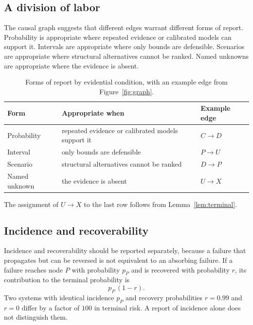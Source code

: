\documentclass[11pt]{article}
\theoremstyle{remark}
\begin{document}
\subsection{A division of labor}

The causal graph suggests that different edges warrant different forms of report. Probability is appropriate where repeated evidence or calibrated models can support it. Intervals are appropriate where only bounds are defensible. Scenarios are appropriate where structural alternatives cannot be ranked. Named unknowns are appropriate where the evidence is absent.

\begin{table}[h]
\centering
\caption{Forms of report by evidential condition, with an example edge from Figure~\ref{fig:graph}.}\label{tab:division}
\begin{tabular}{@{}p{2.4cm}p{6.2cm}p{2.4cm}@{}}
\toprule
Form & Appropriate when & Example edge \\
\midrule
Probability & repeated evidence or calibrated models support it & $C\to D$ \\
Interval & only bounds are defensible & $P\to U$ \\
Scenario & structural alternatives cannot be ranked & $D\to P$ \\
Named unknown & the evidence is absent & $U\to X$ \\
\bottomrule
\end{tabular}
\end{table}

The assignment of $U\to X$ to the last row follows from Lemma~\ref{lem:terminal}.

\subsection{Incidence and recoverability}

Incidence and recoverability should be reported separately, because a failure that propagates but can be reversed is not equivalent to an absorbing failure. If a failure reaches node $P$ with probability $p_P$ and is recovered with probability $r$, its contribution to the terminal probability is
\begin{equation}
p_P\,(1-r).
\end{equation}
Two systems with identical incidence $p_P$ and recovery probabilities $r=0.99$ and $r=0$ differ by a factor of $100$ in terminal risk. A report of incidence alone does not distinguish them.
\end{document}
